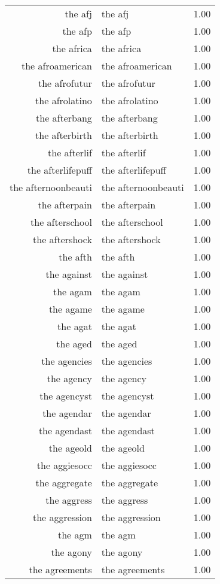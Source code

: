 \begin{table}[ht]
\begin{tabular}{rlr}
  the afj & the afj & 1.00 \\ 
  the afp & the afp & 1.00 \\ 
  the africa & the africa & 1.00 \\ 
  the afroamerican & the afroamerican & 1.00 \\ 
  the afrofutur & the afrofutur & 1.00 \\ 
  the afrolatino & the afrolatino & 1.00 \\ 
  the afterbang & the afterbang & 1.00 \\ 
  the afterbirth & the afterbirth & 1.00 \\ 
  the afterlif & the afterlif & 1.00 \\ 
  the afterlifepuff & the afterlifepuff & 1.00 \\ 
  the afternoonbeauti & the afternoonbeauti & 1.00 \\ 
  the afterpain & the afterpain & 1.00 \\ 
  the afterschool & the afterschool & 1.00 \\ 
  the aftershock & the aftershock & 1.00 \\ 
  the afth & the afth & 1.00 \\ 
  the against & the against & 1.00 \\ 
  the agam & the agam & 1.00 \\ 
  the agame & the agame & 1.00 \\ 
  the agat & the agat & 1.00 \\ 
  the aged & the aged & 1.00 \\ 
  the agencies & the agencies & 1.00 \\ 
  the agency & the agency & 1.00 \\ 
  the agencyst & the agencyst & 1.00 \\ 
  the agendar & the agendar & 1.00 \\ 
  the agendast & the agendast & 1.00 \\ 
  the ageold & the ageold & 1.00 \\ 
  the aggiesocc & the aggiesocc & 1.00 \\ 
  the aggregate & the aggregate & 1.00 \\ 
  the aggress & the aggress & 1.00 \\ 
  the aggression & the aggression & 1.00 \\ 
  the agm & the agm & 1.00 \\ 
  the agony & the agony & 1.00 \\ 
  the agreements & the agreements & 1.00 \\ 

\end{tabular}
\end{table}
